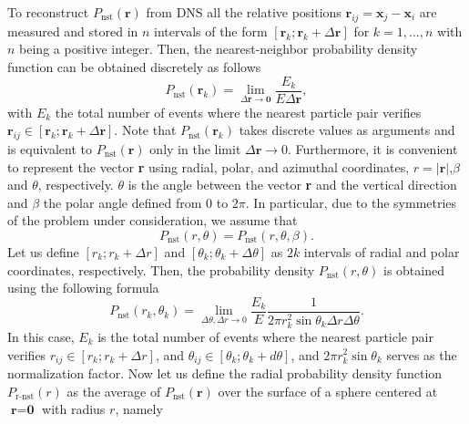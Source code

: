 To reconstruct $P_\text{nst}(\textbf{r})$ from DNS all the relative positions $\textbf{r}_{ij}  = \textbf{x}_j - \textbf{x}_i$ are measured and stored in $n$ intervals of the form $[\textbf{r}_k; \textbf{r}_k+\Delta \textbf{r}]$ for $k = 1,\ldots, n$ with $n$ being a positive integer.
Then, the nearest-neighbor probability density function can be obtained discretely as follows
\begin{equation}
    P_\text{nst}(\textbf{r}_k)
    =\lim_{\Delta \textbf{r} \to \bm 0} \frac{E_k}{E \Delta \textbf{r}},
    \label{eq:vec_cond}
\end{equation}
with $E_k$ the total number of events where the nearest particle pair verifies $\textbf{r}_{ij} \in [\textbf{r}_k ; \textbf{r}_k + \Delta \textbf{r}]$.
Note that $P_\text{nst}(\textbf{r}_k)$ takes discrete values as arguments and is equivalent to $P_\text{nst}(\textbf{r})$ only in the limit $\Delta \textbf{r} \to 0$. 
Furthermore, it is convenient to represent the vector \textbf{r} using radial, polar, and azimuthal coordinates,  $r = |\textbf{r}|$,$\beta$ and $\theta$, respectively. 
$\theta$ is the angle between the vector \textbf{r} and the vertical direction and $\beta$ the polar angle defined from $0$ to $2\pi$. 
In particular, due to the symmetries of the problem under consideration, we assume that
\begin{equation}
    P_\text{nst}(r,\theta)
    = P_\text{nst}(r,\theta,\beta). 
\end{equation}
Let us define $[r_k; r_k+\Delta r]$ and $[\theta_k; \theta_k+\Delta \theta]$  as $2k$ intervals of radial and polar coordinates, respectively. 
Then, the probability density $P_\text{nst}(r,\theta)$ is obtained using the following formula
\begin{equation}
    P_\text{nst}(r_k,\theta_k)
    =
    \lim_{\Delta \theta , \Delta r \to 0}
    \frac{E_k}{E}
    \frac{1}{2\pi  r_k^2 \sin \theta_k \Delta r \Delta \theta}.
    \label{eq:Ptheta_r}
\end{equation}
In this case, $E_k$ is the total number of events where the nearest particle pair verifies $r_{ij} \in [r_k ; r_k + \Delta r]$, and $\theta_{ij} \in [\theta_k; \theta_k+d\theta]$, and $2\pi  r_k^2 \sin \theta_k$ serves as the normalization factor. 
Now let us define the radial probability density function  $P_\text{r-nst}(r)$ as the average of $P_\text{nst}(\textbf{r})$ over the surface of a sphere centered at $\textbf{r}=\textbf{0}$ with radius $r$, namely

